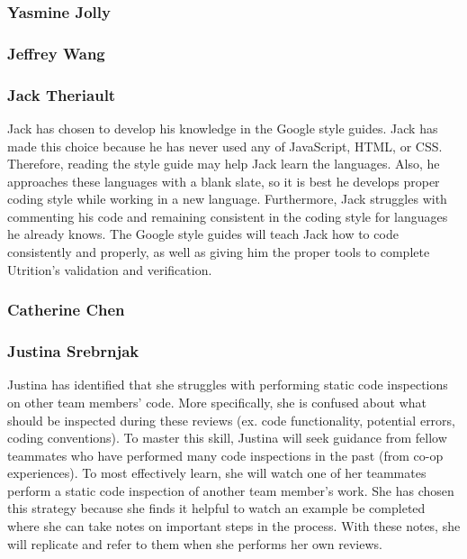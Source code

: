 \documentclass[12pt, titlepage]{article}
\begin{document}
	\subsubsection*{Yasmine Jolly}
	
	\subsubsection*{Jeffrey Wang}
	
	\subsubsection*{Jack Theriault}
	Jack has chosen to develop his knowledge in the Google style guides. Jack has made this choice because he has never used any of JavaScript, HTML, or CSS. Therefore, reading the style guide may help Jack learn the languages. Also, he approaches these languages with a blank slate, so it is best he develops proper coding style  while working in a new language. Furthermore, Jack struggles with commenting his code and remaining consistent in the coding style for languages he already knows. The Google style guides will teach Jack how to code consistently and properly, as well as giving him the proper tools to complete Utrition's validation and verification.
	
	\subsubsection*{Catherine Chen}
	
	\subsubsection*{Justina Srebrnjak}
	Justina has identified that she struggles with performing static code inspections on other team members' code. More specifically, she is confused about what should be inspected during these reviews (ex. code functionality, potential errors, coding conventions). To master this skill, Justina will seek guidance from fellow teammates who have performed many code inspections in the past (from co-op experiences). To most effectively learn, she will watch one of her teammates perform a static code inspection of another team member's work. She has chosen this strategy because she finds it helpful to watch an example be completed where she can take notes on important steps in the process. With these notes, she will replicate and refer to them when she performs her own reviews.
	
\end{document}
